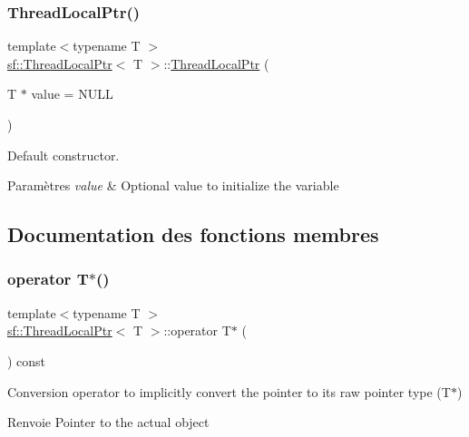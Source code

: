 \subsubsection{\texorpdfstring{Thread\+Local\+Ptr()}{ThreadLocalPtr()}}
{\footnotesize\ttfamily template$<$typename T $>$ \\
\hyperlink{classsf_1_1ThreadLocalPtr}{sf\+::\+Thread\+Local\+Ptr}$<$ T $>$\+::\hyperlink{classsf_1_1ThreadLocalPtr}{Thread\+Local\+Ptr} (\begin{DoxyParamCaption}\item[{T $\ast$}]{value = {\ttfamily NULL} }\end{DoxyParamCaption})}



Default constructor. 


\begin{DoxyParams}{Paramètres}
{\em value} & Optional value to initialize the variable \\
\hline
\end{DoxyParams}


\subsection{Documentation des fonctions membres}
\mbox{\label{classsf_1_1ThreadLocalPtr_a81ca089ae5cda72c7470ca93041c3cb2}} 
\subsubsection{\texorpdfstring{operator T$\ast$()}{operator T*()}}
{\footnotesize\ttfamily template$<$typename T $>$ \\
\hyperlink{classsf_1_1ThreadLocalPtr}{sf\+::\+Thread\+Local\+Ptr}$<$ T $>$\+::operator T$\ast$ (\begin{DoxyParamCaption}{ }\end{DoxyParamCaption}) const}



Conversion operator to implicitly convert the pointer to its raw pointer type (T$\ast$) 

\begin{DoxyReturn}{Renvoie}
Pointer to the actual object 
\end{DoxyReturn}
\mbox{\label{classsf_1_1ThreadLocalPtr_adcbb45ae077df714bf9c61e936d97770}} 

